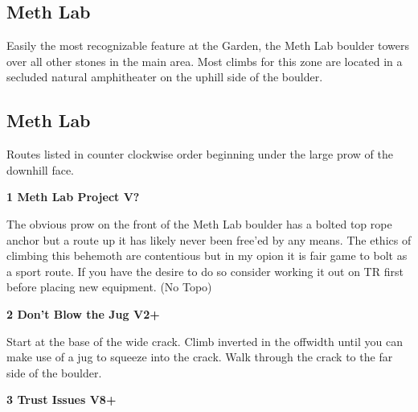 \begin{multicols}{2}
		\section{Meth Lab}\label{sa:Meth Lab}
	\begin{minipage}{\columnwidth}
	Easily the most recognizable feature at the Garden, the Meth Lab boulder towers over all other stones in the main area. Most climbs for this zone are located in a secluded natural amphitheater on the uphill side of the boulder.
	\end{minipage}

			\subsection*{Meth Lab}\label{bf:Meth Lab}
			\begin{minipage}{\columnwidth}
			Routes listed in counter clockwise order beginning under the large prow of the downhill face.
			\end{minipage}
			
\label{pt:Octurnal}
					\begin{minipage}{\linewidth}	
					\label{rt:Meth Lab Project}
\colorbox{black!20}{
\textbf{
1 Meth Lab Project V?  \warn \warn \warn 
}
}

					\begin{adjustwidth}{0.5cm}{}				
					The obvious prow on the front of the Meth Lab boulder has a bolted top rope anchor but a route up it has likely never been free'ed by any means. The ethics of climbing this behemoth are contentious but in my opion it is fair game to bolt as a sport route. If you have the desire to do so consider working it out on TR first before placing new equipment.
						\newline (No Topo) 
					\end{adjustwidth}
					\end{minipage}
								\fullPic{./maps/topos/jesus_c.png}

					\begin{minipage}{\linewidth}	
					\label{rt:Don't Blow the Jug}
\colorbox{green!20}{
\textbf{
2 Don't Blow the Jug V2+    \warn 
}
}

					\begin{adjustwidth}{0.5cm}{}				
					Start at the base of the wide crack. Climb inverted in the offwidth until you can make use of a jug to squeeze into the crack. Walk through the crack to the far side of the boulder.
					\end{adjustwidth}
					\end{minipage}
					\begin{minipage}{\linewidth}	
					\label{rt:Trust Issues}
\colorbox{Goldenrod!50}{
\textbf{
3 Trust Issues V8+  \warn \warn 
}
}


\end{minipage}
\end{multicols}
